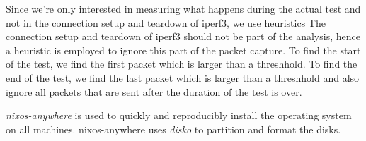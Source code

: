 Since we're only interested in measuring what happens during the actual test and not in the connection setup and teardown of iperf3, we use heuristics
The connection setup and teardown of iperf3 should not be part of the analysis, hence a heuristic is employed to ignore this part of the packet capture.
To find the start of the test, we find the first packet which is larger than a threshhold. To find the end of the test, we find the last packet which is larger than a threshhold and also ignore all packets that are sent after the duration of the test is over.


\textit{nixos-anywhere} \cite{nixos-anywhere} is used to quickly and reproducibly install the operating system on all machines.
nixos-anywhere uses \textit{disko} \cite{disko} to partition and format the disks.



